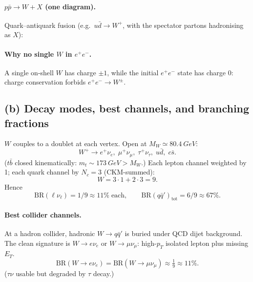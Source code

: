 \documentclass[11pt]{article}
\begin{document}
\paragraph{$p\bar p\to W+X$ (one diagram).} Quark--antiquark fusion (e.g.\ $u\bar d\to W^+$, with the spectator partons hadronising as $X$):
\begin{center}
\end{center}

\paragraph{Why no single $W$ in $e^+e^-$.} A single on-shell $W$ has charge $\pm 1$, while the initial $e^+e^-$ state has charge $0$: charge conservation forbids $e^+e^-\to W^\pm$.

\subsection*{(b) Decay modes, best channels, and branching fractions}

$W$ couples to a doublet at each vertex. Open at $M_W\simeq\SI{80.4}{GeV}$:
\[
W^+ \to e^+\nu_e,\;\mu^+\nu_\mu,\;\tau^+\nu_\tau,\;u\bar d,\;c\bar s.
\]
($t\bar b$ closed kinematically: $m_t\sim\SI{173}{GeV}>M_W$.) Each lepton channel weighted by 1; each quark channel by $N_c=3$ (CKM-summed):
\[
W = 3\cdot 1 + 2\cdot 3 = 9.
\]
Hence
\[
\text{BR}(\ell\nu_\ell) = 1/9 \approx 11\%\;\text{each},\qquad \text{BR}(q\bar q')_\text{tot} = 6/9 \approx 67\%.
\]

\paragraph{Best collider channels.} At a hadron collider, hadronic $W\to q\bar q'$ is buried under QCD dijet background. The clean signature is $W\to e\nu_e$ or $W\to\mu\nu_\mu$: high-$p_T$ isolated lepton plus missing $E_T$.
\[
\boxed{\;\text{BR}(W\to e\nu_e) = \text{BR}(W\to \mu\nu_\mu) \approx \tfrac{1}{9} \approx 11\%.\;}
\]
($\tau\nu$ usable but degraded by $\tau$ decay.)
\end{document}
